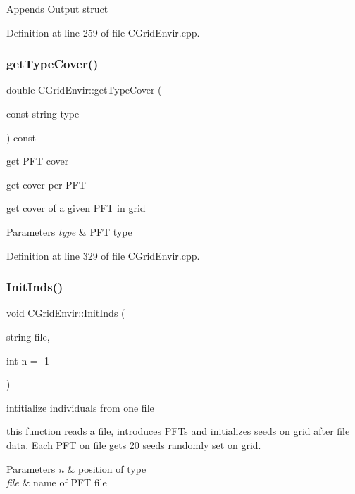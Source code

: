 Appends Output struct 

Definition at line 259 of file C\+Grid\+Envir.\+cpp.

\mbox{\label{class_c_grid_envir_a9f8abae7df32c801895f3e7ff7f967cf}} 
\subsubsection{\texorpdfstring{getTypeCover()}{getTypeCover()}}
{\footnotesize\ttfamily double C\+Grid\+Envir\+::get\+Type\+Cover (\begin{DoxyParamCaption}\item[{const string}]{type }\end{DoxyParamCaption}) const}



get P\+FT cover 

get cover per P\+FT

get cover of a given P\+FT in grid 
\begin{DoxyParams}{Parameters}
{\em type} & P\+FT type \\
\hline
\end{DoxyParams}


Definition at line 329 of file C\+Grid\+Envir.\+cpp.

\mbox{\label{class_c_grid_envir_a0b5b1fcf08b608c6aed31fea9325c62b}} 
\subsubsection{\texorpdfstring{InitInds()}{InitInds()}}
{\footnotesize\ttfamily void C\+Grid\+Envir\+::\+Init\+Inds (\begin{DoxyParamCaption}\item[{string}]{file,  }\item[{int}]{n = {\ttfamily -\/1} }\end{DoxyParamCaption})\hspace{0.3cm}{\ttfamily [virtual]}}



intitialize individuals from one file 

this function reads a file, introduces P\+F\+Ts and initializes seeds on grid after file data. Each P\+FT on file gets 20 seeds randomly set on grid. 
\begin{DoxyParams}{Parameters}
{\em n} & position of type \\
\hline
{\em file} & name of P\+FT file \\
\hline
\end{DoxyParams}



